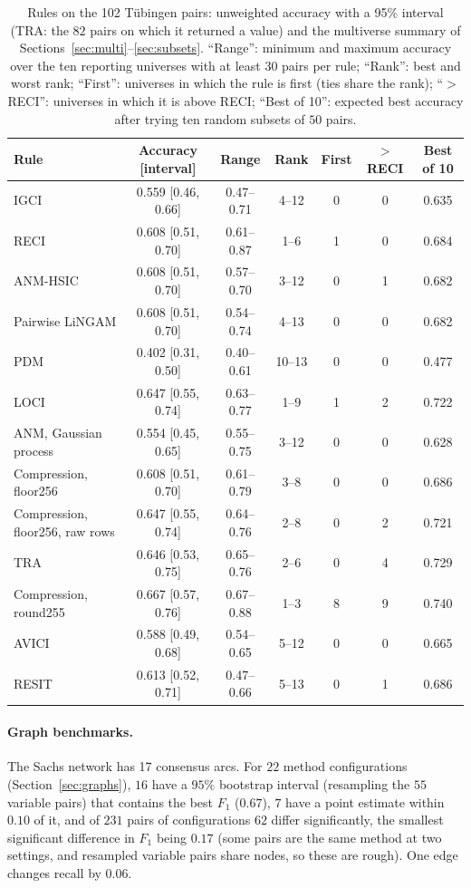\begin{table}[t]
\caption{Rules on the 102 T\"ubingen pairs: unweighted accuracy with a 95\% interval (TRA: the $82$ pairs on which it returned a value) and the multiverse summary of Sections~\ref{sec:multi}--\ref{sec:subsets}. ``Range'': minimum and maximum accuracy over the ten reporting universes with at least $30$ pairs per rule; ``Rank'': best and worst rank; ``First'': universes in which the rule is first (ties share the rank); ``$>$RECI'': universes in which it is above RECI; ``Best of 10'': expected best accuracy after trying ten random subsets of $50$ pairs.}
\label{tab:multi}
\small
\setlength{\tabcolsep}{3pt}
\begin{tabular}{@{}lcccccc@{}}
\toprule
Rule & Accuracy [interval] & Range & Rank & First & $>$RECI & Best of 10\\
\midrule
IGCI & 0.559 [0.46, 0.66] & 0.47--0.71 & 4--12 & 0 & 0 & 0.635\\
RECI & 0.608 [0.51, 0.70] & 0.61--0.87 & 1--6 & 1 & 0 & 0.684\\
ANM-HSIC & 0.608 [0.51, 0.70] & 0.57--0.70 & 3--12 & 0 & 1 & 0.682\\
Pairwise LiNGAM & 0.608 [0.51, 0.70] & 0.54--0.74 & 4--13 & 0 & 0 & 0.682\\
PDM & 0.402 [0.31, 0.50] & 0.40--0.61 & 10--13 & 0 & 0 & 0.477\\
LOCI & 0.647 [0.55, 0.74] & 0.63--0.77 & 1--9 & 1 & 2 & 0.722\\
ANM, Gaussian process & 0.554 [0.45, 0.65] & 0.55--0.75 & 3--12 & 0 & 0 & 0.628\\
Compression, floor256 & 0.608 [0.51, 0.70] & 0.61--0.79 & 3--8 & 0 & 0 & 0.686\\
Compression, floor256, raw rows & 0.647 [0.55, 0.74] & 0.64--0.76 & 2--8 & 0 & 2 & 0.721\\
TRA & 0.646 [0.53, 0.75] & 0.65--0.76 & 2--6 & 0 & 4 & 0.729\\
Compression, round255 & 0.667 [0.57, 0.76] & 0.67--0.88 & 1--3 & 8 & 9 & 0.740\\
AVICI & 0.588 [0.49, 0.68] & 0.54--0.65 & 5--12 & 0 & 0 & 0.665\\
RESIT & 0.613 [0.52, 0.71] & 0.47--0.66 & 5--13 & 0 & 1 & 0.686\\
\bottomrule
\end{tabular}
\end{table}

\paragraph{Graph benchmarks.} The Sachs network has 17 consensus arcs. For $22$ method configurations (Section~\ref{sec:graphs}), $16$ have a $95\%$ bootstrap interval (resampling the $55$ variable pairs) that contains the best $F_1$ ($0.67$), $7$ have a point estimate within $0.10$ of it, and of $231$ pairs of configurations $62$ differ significantly, the smallest significant difference in $F_1$ being $0.17$ (some pairs are the same method at two settings, and resampled variable pairs share nodes, so these are rough). One edge changes recall by $0.06$.
